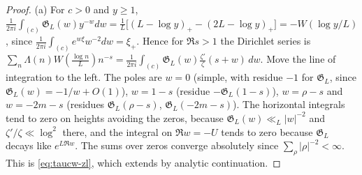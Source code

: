 \documentclass[11pt,a4paper]{article}
\numberwithin{equation}{section}
\theoremstyle{definition}
\theoremstyle{remark}
\begin{document}
\begin{proof}
(a) For $c>0$ and $y\ge1$, $\frac1{2\pi i}\int_{(c)}\mathfrak G_L(w)y^{-w}dw=\frac1L\bigl[(L-\log y)_+-(2L-\log y)_+\bigr]=-W(\log y/L)$, since $\frac1{2\pi i}\int_{(c)}e^{w\xi}w^{-2}dw=\xi_+$. Hence for $\Re s>1$ the Dirichlet series is $\sum_n\Lambda(n)W(\tfrac{\log n}L)n^{-s}=\frac1{2\pi i}\int_{(c)}\mathfrak G_L(w)\frac{\zeta'}{\zeta}(s+w)\,dw$. Move the line of integration to the left. The poles are $w=0$ (simple, with residue $-1$ for $\mathfrak G_L$, since $\mathfrak G_L(w)=-1/w+O(1)$), $w=1-s$ (residue $-\mathfrak G_L(1-s)$), $w=\rho-s$ and $w=-2m-s$ (residues $\mathfrak G_L(\rho-s)$, $\mathfrak G_L(-2m-s)$). The horizontal integrals tend to zero on heights avoiding the zeros, because $\mathfrak G_L(w)\ll_L|w|^{-2}$ and $\zeta'/\zeta\ll\log^2$ there, and the integral on $\Re w=-U$ tends to zero because $\mathfrak G_L$ decays like $e^{L\Re w}$. The sums over zeros converge absolutely since $\sum_\rho|\rho|^{-2}<\infty$. This is \eqref{eq:taucw-zl}, which extends by analytic continuation.


\end{proof}
\end{document}
